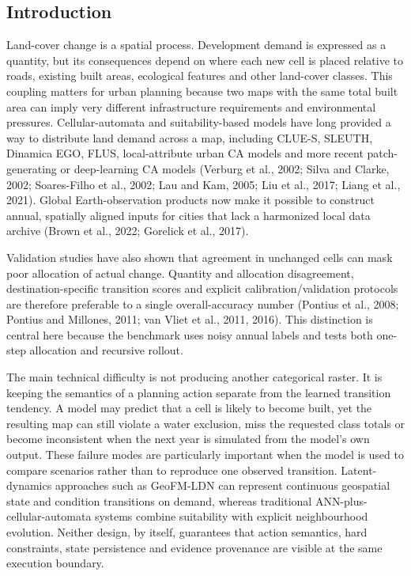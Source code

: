 \documentclass[
]{article}
\begin{document}
\subsection{Introduction}\label{introduction}

Land-cover change is a spatial process. Development demand is expressed
as a quantity, but its consequences depend on where each new cell is
placed relative to roads, existing built areas, ecological features and
other land-cover classes. This coupling matters for urban planning
because two maps with the same total built area can imply very different
infrastructure requirements and environmental pressures.
Cellular-automata and suitability-based models have long provided a way
to distribute land demand across a map, including CLUE-S, SLEUTH,
Dinamica EGO, FLUS, local-attribute urban CA models and more recent
patch-generating or deep-learning CA models (Verburg et al., 2002; Silva
and Clarke, 2002; Soares-Filho et al., 2002; Lau and Kam, 2005; Liu et
al., 2017; Liang et al., 2021). Global Earth-observation products now
make it possible to construct annual, spatially aligned inputs for
cities that lack a harmonized local data archive (Brown et al., 2022;
Gorelick et al., 2017).

Validation studies have also shown that agreement in unchanged cells can
mask poor allocation of actual change. Quantity and allocation
disagreement, destination-specific transition scores and explicit
calibration/validation protocols are therefore preferable to a single
overall-accuracy number (Pontius et al., 2008; Pontius and Millones,
2011; van Vliet et al., 2011, 2016). This distinction is central here
because the benchmark uses noisy annual labels and tests both one-step
allocation and recursive rollout.

The main technical difficulty is not producing another categorical
raster. It is keeping the semantics of a planning action separate from
the learned transition tendency. A model may predict that a cell is
likely to become built, yet the resulting map can still violate a water
exclusion, miss the requested class totals or become inconsistent when
the next year is simulated from the model's own output. These failure
modes are particularly important when the model is used to compare
scenarios rather than to reproduce one observed transition.
Latent-dynamics approaches such as GeoFM-LDN can represent continuous
geospatial state and condition transitions on demand, whereas
traditional ANN-plus-cellular-automata systems combine suitability with
explicit neighbourhood evolution. Neither design, by itself, guarantees
that action semantics, hard constraints, state persistence and evidence
provenance are visible at the same execution boundary.
\end{document}
